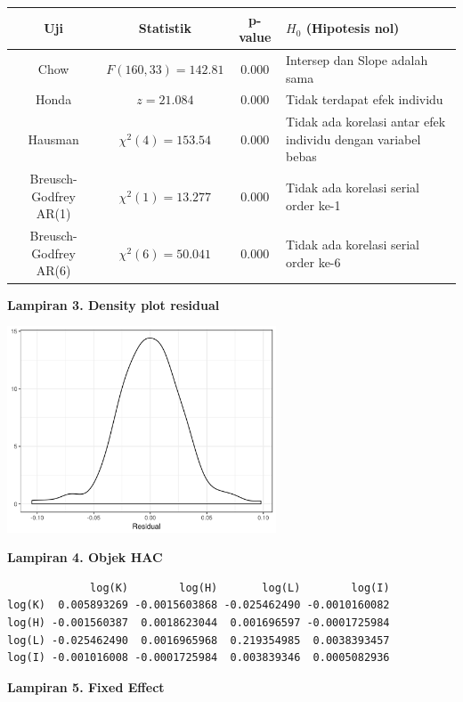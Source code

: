 \begin{center}
\begin{tabular}{cccp{5cm}}
\toprule
Uji                 & Statistik             & p-value  & $H_0$ (Hipotesis nol) \\
\midrule
Chow                & $F(160, 33) = 142.81$ & 0.000    & Intersep dan Slope adalah sama \\
Honda               & $z = 21.084$          & 0.000    & Tidak terdapat efek individu    \\
Hausman             & $\chi^2(4) = 153.54$  & 0.000    & Tidak ada korelasi antar efek individu dengan variabel bebas\\
Breusch-Godfrey AR(1) & $\chi^2(1) = 13.277$  & 0.000    & Tidak ada korelasi serial order ke-1    \\
Breusch-Godfrey AR(6) & $\chi^2(6) = 50.041$  & 0.000    & Tidak ada korelasi serial order ke-6    \\
\bottomrule
\end{tabular}
\end{center}

\newpage

\textbf{Lampiran 3. Density plot residual}

\includegraphics[width = 0.6\textwidth]{img/galat-density.png}

\textbf{Lampiran 4. Objek HAC}

\begin{verbatim}
             log(K)        log(H)       log(L)        log(I)
log(K)  0.005893269 -0.0015603868 -0.025462490 -0.0010160082
log(H) -0.001560387  0.0018623044  0.001696597 -0.0001725984
log(L) -0.025462490  0.0016965968  0.219354985  0.0038393457
log(I) -0.001016008 -0.0001725984  0.003839346  0.0005082936
\end{verbatim}

\textbf{Lampiran 5. Fixed Effect}

